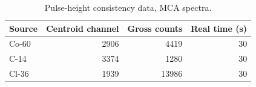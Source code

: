 \begin{table}[htbp]
\centering
\caption{Pulse-height consistency data, MCA spectra.}
\label{tab:ph-raw}
\begin{tabular}{lrrr}
\toprule
Source & Centroid channel & Gross counts & Real time (s) \\
\midrule
Co-60 & 2906 & 4419 & 30 \\
C-14 & 3374 & 1280 & 30 \\
Cl-36 & 1939 & 13986 & 30 \\
\bottomrule
\end{tabular}
\end{table}
